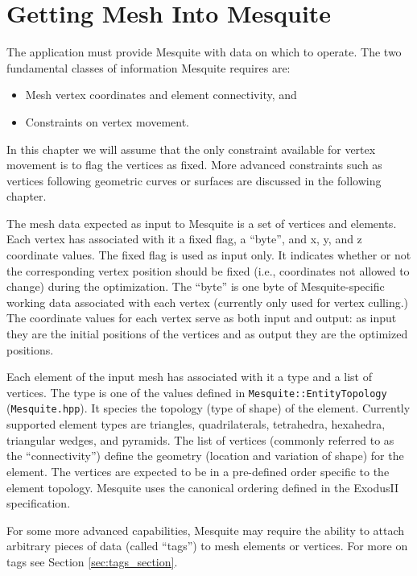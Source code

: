 \chapter{Getting Mesh Into Mesquite}
\label{sec:meshes}

The application must provide Mesquite with data on which to operate.  The two
fundamental classes of information Mesquite requires are:
\begin{itemize}
\item Mesh vertex coordinates and element connectivity, and
\item Constraints on vertex movement.
\end{itemize}
In this chapter we will assume that the only constraint available for vertex movement is to flag the vertices as fixed.  More advanced constraints such as vertices following geometric curves or surfaces are discussed in the following chapter.  

The mesh data expected as input to Mesquite is a set of vertices and elements.  Each vertex has associated with it a fixed flag, a ``byte'', and x, y, and z coordinate values.  The fixed flag is used as input only.  It indicates whether or not the corresponding vertex position should be fixed (i.e., coordinates not allowed to change) during the optimization.  The ``byte'' is one byte of Mesquite-specific working data associated with each vertex (currently only used for vertex culling.)   The coordinate values for each vertex serve as both input and output: as input they are the initial positions of the vertices and as output they are the optimized positions.  

Each element of the input mesh has associated with it a type and a list of vertices.  The type is one of the values defined in \texttt{Mesquite::EntityTopology} (\texttt{Mesquite.hpp}).  It species the topology (type of shape) of the element. Currently supported element types are triangles, quadrilaterals, 
tetrahedra, hexahedra, triangular wedges, and pyramids.  The list of vertices (commonly referred to as the ``connectivity'') define the geometry (location and variation of shape) for the element.  The vertices are expected to be in a pre-defined order specific to the element topology. Mesquite uses the canonical ordering defined in the ExodusII specification\cite{exodus}.

For some more advanced capabilities, Mesquite may require the ability to attach arbitrary pieces of data (called ``tags'') to mesh elements or vertices. For more on tags see Section \ref{sec:tags_section}.


